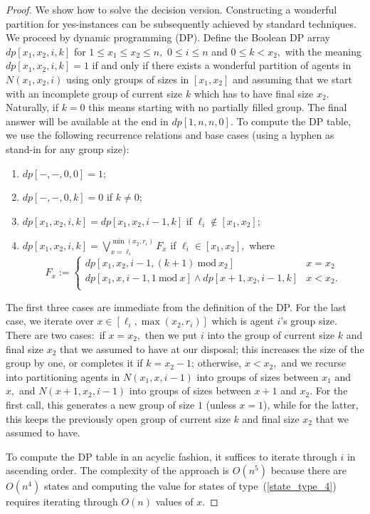 \documentclass[a4paper]{article}
\newcommand{\Mod}[1]{\ \mathrm{mod}\ #1}
\begin{document}
\begin{proof} We show how to solve the decision version. Constructing a wonderful partition for yes-instances can be subsequently achieved by standard techniques. We proceed by dynamic programming (DP). Define the Boolean DP array $\mathit{dp}[x_1, x_2, i, k]$ for $1 \leq x_1 \leq x_2 \leq n,$ $0 \leq i \leq n$ and $0 \leq k < x_2,$ with the meaning $\mathit{dp}[x_1, x_2, i, k] = 1$ if and only if there exists a wonderful partition of agents in $N(x_1, x_2, i)$ using only groups of sizes in $[x_1, x_2]$ and assuming that we start with an incomplete group of current size $k$ which has to have final size $x_2.$ Naturally, if $k = 0$ this means starting with no partially filled group. The final answer will be available at the end in $\mathit{dp}[1, n, n, 0].$ To compute the DP table, we use the following recurrence relations and base cases (using a hyphen as stand-in for any group size):

\begin{enumerate}
    \itemsep0em 
    \item $\mathit{dp}[-, -, 0, 0] = 1$;
    \item $\mathit{dp}[-, -, 0, k] = 0$ if $k \neq 0$;
    \item $\mathit{dp}[x_1, x_2, i, k] = \mathit{dp}[x_1, x_2, i - 1, k]$ if $\ell_i \notin [x_1, x_2]$;
    \item \label{state_type_4} $\mathit{dp}[x_1, x_2, i, k] = \bigvee_{x = \ell_i}^{\min(x_2, r_i)}F_x$ if $\ell_i \in [x_1, x_2],$ where 
    \[ 
F_x := \left\{
\begin{array}{ll}
      \mathit{dp}[x_1, x_2, i - 1, (k + 1) \Mod{x_2}] & x = x_2 \\
      \mathit{dp}[x_1, x, i - 1, 1 \Mod{x}] \land \mathit{dp}[x + 1, x_2, i - 1, k] & x < x_2. \\
\end{array} 
\right. 
\]
\end{enumerate}
The first three cases are immediate from the definition of the DP. For the last case, we iterate over $x \in [\ell_i, \max(x_2, r_i)]$ which is agent $i$'s group size. There are two cases:~if $x = x_2,$ then we put $i$ into the group of current size $k$ and final size $x_2$ that we assumed to have at our disposal; this increases the size of the group by one, or completes it if $k = x_2 - 1$; otherwise, $x < x_2,$ and we recurse into partitioning agents in $N(x_1, x, i - 1)$ into groups of sizes between $x_1$ and $x,$ and $N(x + 1, x_2, i - 1)$ into groups of sizes between $x + 1$ and $x_2.$ For the first call, this generates a new group of size $1$ (unless $x = 1$), while for the latter, this keeps the previously open group of current size $k$ and final size $x_2$ that we assumed to have.

To compute the DP table in an acyclic fashion, it suffices to iterate through $i$ in ascending order. The complexity of the approach is $O(n^5)$ because there are $O(n^4)$ states and computing the value for states of type~(\ref{state_type_4}) requires iterating through $O(n)$ values of $x.$
\end{proof}
\end{document}
